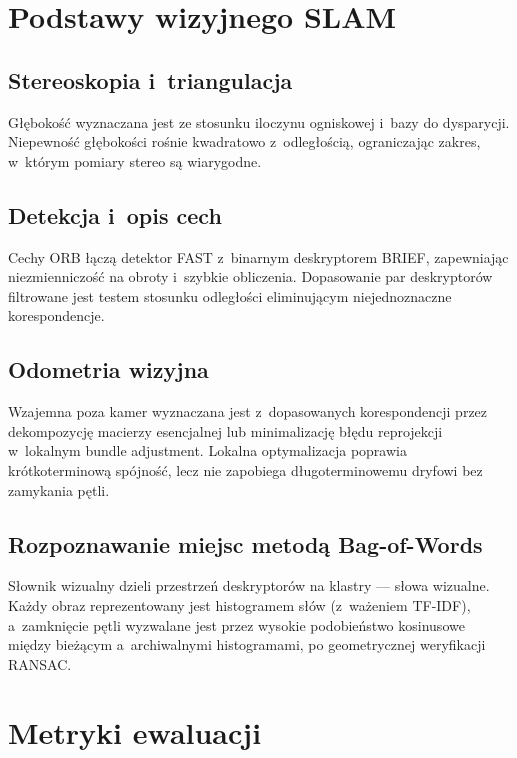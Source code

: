 \section{Podstawy wizyjnego SLAM}

\subsection{Stereoskopia i~triangulacja}

Głębokość wyznaczana jest ze stosunku iloczynu ogniskowej i~bazy do dysparycji.
Niepewność głębokości rośnie kwadratowo z~odległością, ograniczając zakres,
w~którym pomiary stereo są wiarygodne.

\subsection{Detekcja i~opis cech}

Cechy ORB łączą detektor FAST z~binarnym deskryptorem BRIEF,
zapewniając niezmienniczość na obroty i~szybkie obliczenia.
Dopasowanie par deskryptorów filtrowane jest testem stosunku odległości
eliminującym niejednoznaczne korespondencje.

\subsection{Odometria wizyjna}

Wzajemna poza kamer wyznaczana jest z~dopasowanych korespondencji
przez dekompozycję macierzy esencjalnej lub minimalizację błędu reprojekcji
w~lokalnym bundle adjustment.
Lokalna optymalizacja poprawia krótkoterminową spójność, lecz nie zapobiega
długoterminowemu dryfowi bez zamykania pętli.

\subsection{Rozpoznawanie miejsc metodą Bag-of-Words}

Słownik wizualny dzieli przestrzeń deskryptorów na klastry --- słowa wizualne.
Każdy obraz reprezentowany jest histogramem słów (z~ważeniem TF-IDF),
a~zamknięcie pętli wyzwalane jest przez wysokie podobieństwo kosinusowe
między bieżącym a~archiwalnymi histogramami, po geometrycznej weryfikacji RANSAC.

\section{Metryki ewaluacji}

